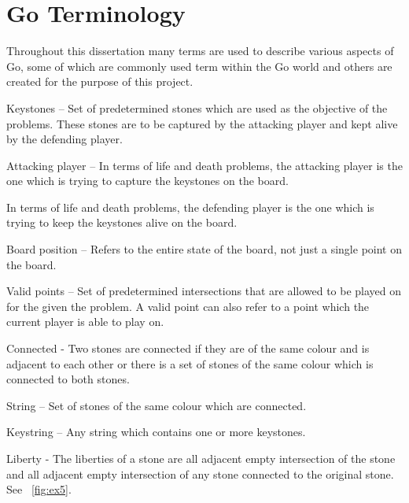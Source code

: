 \documentclass{l4proj}
\begin{document}
\section{Go Terminology}

Throughout this dissertation many terms are used to describe various aspects of Go, some of which are commonly used term within the Go world and others are created for the purpose of this project.

Keystones – Set of predetermined stones which are used as the objective of the problems. These stones are to be captured by the attacking player and kept alive by the defending player.

Attacking player – In terms of life and death problems, the attacking player is the one which is trying to capture the keystones on the board.

In terms of life and death problems, the defending player is the one which is trying to keep the keystones alive on the board.

Board position – Refers to the entire state of the board, not just a single point on the board.

Valid points – Set of predetermined intersections that are allowed to be played on for the given the problem. A valid point can also refer to a point which the current player is able to play on.

Connected - Two stones are connected if they are of the same colour and is adjacent to each other or there is a set of stones of the same colour which is connected to both stones.

String – Set of stones of the same colour which are connected.

Keystring – Any string which contains one or more keystones.


Liberty - The liberties of a stone are all adjacent empty intersection of the stone and all adjacent empty intersection of any stone connected to the original stone. See ~\autoref{fig:ex5}.
\end{document}
